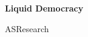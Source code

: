 \documentclass[12pt]{article}
\begin{document}
	\pagestyle{empty}
	
	\begin{center}
		\vspace*{1.5cm}
		\vspace{0.5cm}
		\textbf{\huge{Liquid Democracy}}
		
		\vspace{0.5cm}
		ASResearch
		\textbf{}
	\end{center}





	




	
\end{document}
